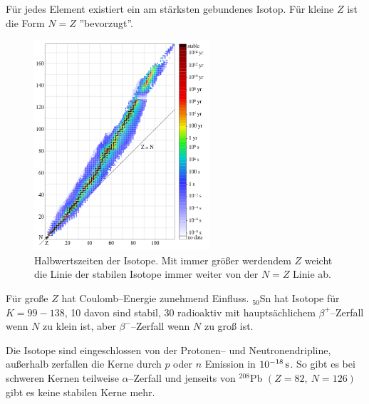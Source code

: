 \documentclass[Ex4_Zusammenfassung.tex]{subfiles}
\begin{document}
Für jedes Element existiert ein am stärksten gebundenes Isotop. Für kleine $Z$ ist die Form $N=Z$ ''bevorzugt''.
\begin{figure}[h]
	\centering
	\includegraphics[width=0.58\textwidth]{isotopes.png}
	\caption{Halbwertszeiten der Isotope. Mit immer größer werdendem $Z$ weicht die Linie der stabilen Isotope immer weiter von der $N=Z$ Linie ab.}
\end{figure}
 Für große $Z$ hat Coulomb--Energie zunehmend Einfluss. $_{50}$Sn hat Isotope für $K=99-138$, 10 davon sind stabil, 30 radioaktiv mit hauptsächlichem $\beta^+$--Zerfall wenn $N$ zu klein ist, aber $\beta^-$--Zerfall wenn $N$ zu groß ist.
 
 Die Isotope sind eingeschlossen von der Protonen-- und Neutronendripline, außerhalb zerfallen die Kerne durch $p$ oder $n$ Emission in $\SI{E-18}{s}$. So gibt es bei schweren Kernen teilweise $\alpha$--Zerfall und jenseits von $^{208}$Pb $(Z=82,\ N=126)$ gibt es keine stabilen Kerne mehr.
 
\end{document}
